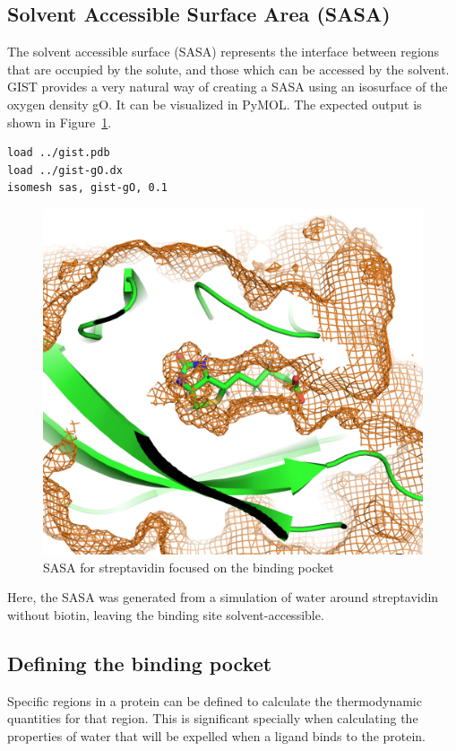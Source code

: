\documentclass[9pt,tutorial]{livecoms}
\begin{document}
\subsection{Solvent Accessible Surface Area (SASA)}

The solvent accessible surface (SASA) represents the interface between regions that are occupied by the solute, and those which can be accessed by the solvent.
GIST provides a very natural way of creating a SASA using an isosurface of the oxygen density gO.
It can be visualized in PyMOL.
The expected output is shown in Figure~\ref{fig-streptavidin_sasa}.

\begin{lstlisting}[style=pymol]
load ../gist.pdb
load ../gist-gO.dx
isomesh sas, gist-gO, 0.1
\end{lstlisting}

\begin{figure}
	\centering
	\includegraphics[width=1.0\linewidth]{figures/sasa-simple.png}
	\caption{SASA for streptavidin focused on the binding pocket}\label{fig-streptavidin_sasa}
\end{figure}

Here, the SASA was generated from a simulation of water around streptavidin without biotin, leaving the binding site solvent-accessible.

\subsection{Defining the binding pocket}
Specific regions in a protein can be defined to calculate the thermodynamic quantities for that region.
This is significant specially when calculating the properties of water that will be expelled when a ligand binds to the protein.
\end{document}
